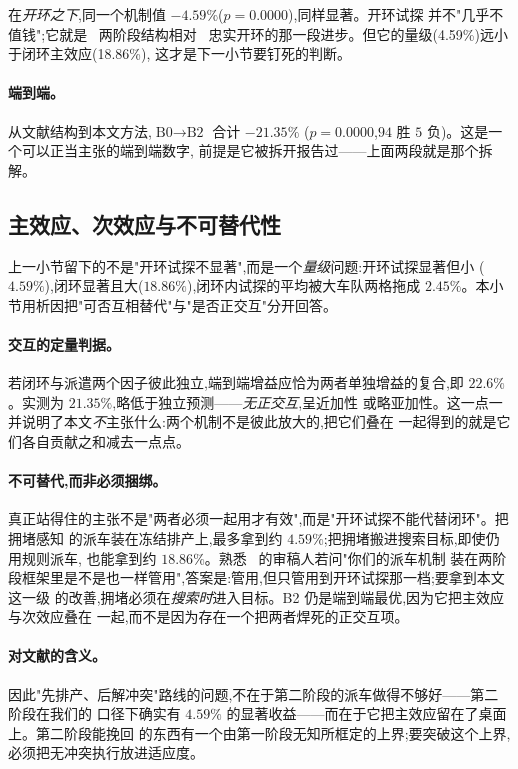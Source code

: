 \documentclass[manuscript,screen,review]{acmart}
\newcommand{\GainLoopRule}{18.86\%}      %
\newcommand{\GainProbeOpen}{4.59\%}      %
\newcommand{\PProbeOpen}{0.0000}
\newcommand{\GainProbeLoop}{2.45\%}      %
\newcommand{\GainEndToEnd}{21.35\%}      %
\newcommand{\PEndToEnd}{0.0000}
\newcommand{\WinEndToEnd}{94}
\newcommand{\LoseEndToEnd}{5}
\newcommand{\GainIndepProduct}{22.6\%}
\begin{document}
在\emph{开环之下},同一个机制值 $-\GainProbeOpen$($p=\PProbeOpen$),同样显著。开环试探
并不"几乎不值钱";它就是~\cite{sun2023integrated} 两阶段结构相对~\cite{li2026framework}
忠实开环的那一段进步。但它的量级(\GainProbeOpen{})远小于闭环主效应(\GainLoopRule{}),
这才是下一小节要钉死的判断。

\paragraph{端到端。}
从文献结构到本文方法,$\text{B0}\to\text{B2}$ 合计 $-\GainEndToEnd$
($p=\PEndToEnd$,$\WinEndToEnd$ 胜 $\LoseEndToEnd$ 负)。这是一个可以正当主张的端到端数字,
前提是它被拆开报告过——上面两段就是那个拆解。

\subsection{主效应、次效应与不可替代性}
\label{sec:complement}

上一小节留下的不是"开环试探不显著",而是一个\emph{量级}问题:开环试探显著但小
($\GainProbeOpen$),闭环显著且大($\GainLoopRule$),闭环内试探的平均被大车队两格拖成
$\GainProbeLoop$。本小节用析因把"可否互相替代"与"是否正交互"分开回答。

\paragraph{交互的定量判据。}
若闭环与派遣两个因子彼此独立,端到端增益应恰为两者单独增益的复合,即
$\GainIndepProduct$。实测为 $\GainEndToEnd$,略低于独立预测——\emph{无正交互},呈近加性
或略亚加性。这一点一并说明了本文\emph{不}主张什么:两个机制不是彼此放大的,把它们叠在
一起得到的就是它们各自贡献之和减去一点点。

\paragraph{不可替代,而非必须捆绑。}
真正站得住的主张不是"两者必须一起用才有效",而是"开环试探不能代替闭环"。把拥堵感知
的派车装在冻结排产上,最多拿到约 $\GainProbeOpen$;把拥堵搬进搜索目标,即使仍用规则派车,
也能拿到约 $\GainLoopRule$。熟悉~\cite{sun2023integrated} 的审稿人若问"你们的派车机制
装在两阶段框架里是不是也一样管用",答案是:管用,但只管用到开环试探那一档;要拿到本文这一级
的改善,拥堵必须在\emph{搜索时}进入目标。B2 仍是端到端最优,因为它把主效应与次效应叠在
一起,而不是因为存在一个把两者焊死的正交互项。

\paragraph{对文献的含义。}
因此"先排产、后解冲突"路线的问题,不在于第二阶段的派车做得不够好——第二阶段在我们的
口径下确实有 $\GainProbeOpen$ 的显著收益——而在于它把主效应留在了桌面上。第二阶段能挽回
的东西有一个由第一阶段无知所框定的上界;要突破这个上界,必须把无冲突执行放进适应度。
\end{document}
